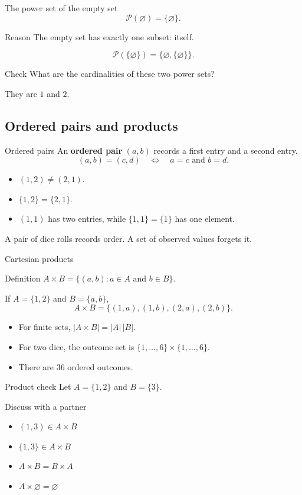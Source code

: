 \documentclass{beamer}
\newcommand{\pow}{\mathcal{P}}
\begin{document}
\begin{frame}{The power set of the empty set}
\[\pow(\varnothing)=\{\varnothing\}.\]\begin{block}{Reason}
The empty set has exactly one subset: itself.
\end{block}\[\pow(\{\varnothing\})=\{\varnothing,\{\varnothing\}\}.\]\begin{block}{Check}
What are the cardinalities of these two power sets?\medskip\par They are $1$ and $2$.
\end{block}
\end{frame}

\subsection{Ordered pairs and products}
\begin{frame}{Ordered pairs}
An \textbf{ordered pair} $(a,b)$ records a first entry and a second entry.\[(a,b)=(c,d)\quad\Longleftrightarrow\quad a=c\text{ and }b=d.\]\begin{itemize}
\item $(1,2)\ne(2,1)$.
\item $\{1,2\}=\{2,1\}$.
\item $(1,1)$ has two entries, while $\{1,1\}=\{1\}$ has one element.
\end{itemize}\medskip A pair of dice rolls records order. A set of observed values forgets it.
\end{frame}
\begin{frame}{Cartesian products}
\begin{block}{Definition}
$A\times B=\{(a,b):a\in A\text{ and }b\in B\}$.
\end{block}If $A=\{1,2\}$ and $B=\{a,b\}$,\[A\times B=\{(1,a),(1,b),(2,a),(2,b)\}.\]\begin{itemize}
\item For finite sets, $|A\times B|=|A|\,|B|$.
\item For two dice, the outcome set is $\{1,\ldots,6\}\times\{1,\ldots,6\}$.
\item There are $36$ ordered outcomes.
\end{itemize}
\end{frame}
\begin{frame}{Product check}
Let $A=\{1,2\}$ and $B=\{3\}$.
\begin{block}{Discuss with a partner}
\begin{itemize}
\item $(1,3)\in A\times B$
\item $\{1,3\}\in A\times B$
\item $A\times B=B\times A$
\item $A\times\varnothing=\varnothing$
\end{itemize}
\end{block}
\end{frame}
\end{document}
